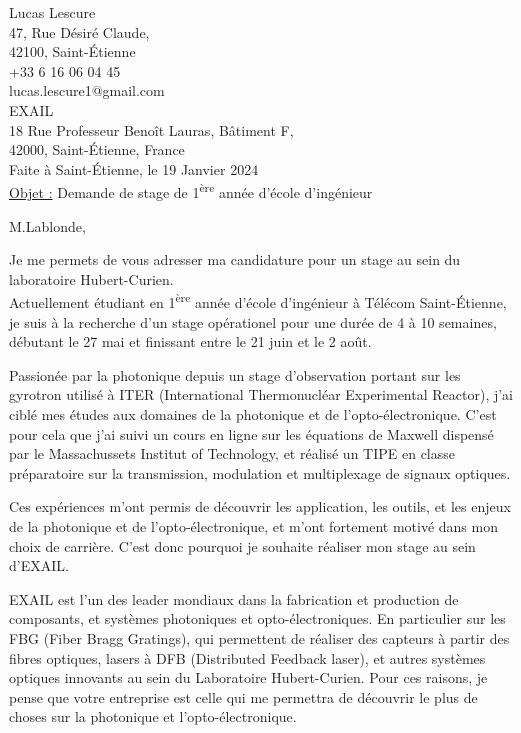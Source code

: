 \documentclass[11pt]{article}
\begin{document}
\thispagestyle{empty}
Lucas Lescure\\
47, Rue Désiré Claude,\\
42100, Saint-Étienne\\
+33 6 16 06 04 45\\
lucas.lescure1@gmail.com\\

\hfill EXAIL\\

\hfill  18 Rue Professeur Benoît Lauras, Bâtiment F,\\
\vspace{1pt}
\hfill 42000, Saint-Étienne, France\\

\vspace{0.1cm}
\hfill Faite à Saint-Étienne, le 19 Janvier 2024\\


\underline{Objet :} Demande de stage de 1\textsuperscript{ère} année d'école d'ingénieur

\vspace{0.5cm}

M.Lablonde,

\vspace{0.5cm}
Je me permets de vous adresser ma candidature pour un stage au sein du laboratoire Hubert-Curien.\\
Actuellement étudiant en 1\textsuperscript{ère} année d'école d'ingénieur à Télécom Saint-Étienne, je suis à la recherche d'un stage opérationel pour une durée de 4 à 10 semaines, débutant le 27 mai et finissant entre le 21 juin et le  2 août.

\vspace{0.5cm}
Passionée par la photonique depuis un stage d'observation portant sur les gyrotron utilisé à ITER (International Thermonucléar Experimental Reactor), j'ai ciblé mes études aux domaines de la photonique et de l'opto-électronique. C'est pour cela que j'ai suivi un cours en ligne sur les équations de Maxwell dispensé par le Massachussets Institut of Technology, et réalisé un TIPE en classe préparatoire sur la transmission, modulation et multiplexage de signaux optiques.

\vspace{0.5cm}
Ces expériences m'ont permis de découvrir les application, les outils, et les enjeux de la photonique et de l'opto-électronique, et m'ont fortement motivé dans mon choix de carrière. C'est donc pourquoi je souhaite réaliser mon stage au sein d'EXAIL.

\vspace{0.5cm}
EXAIL est l'un des leader mondiaux dans la fabrication et production de composants, et systèmes photoniques et opto-électroniques. En particulier sur les FBG (Fiber Bragg Gratings), qui permettent de réaliser des capteurs à partir des fibres optiques, lasers à DFB (Distributed Feedback laser), et autres systèmes optiques innovants au sein du Laboratoire Hubert-Curien. Pour ces raisons, je pense que votre entreprise est celle qui me permettra de découvrir le plus de choses sur la photonique et l'opto-électronique.
\end{document}
